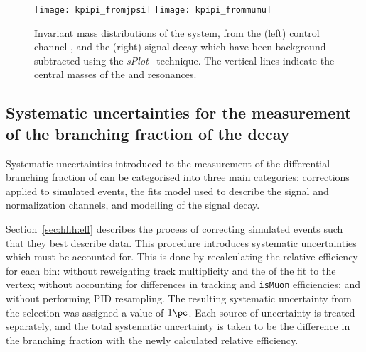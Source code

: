 %
%

\begin{figure}
  \begin{center}
    \texttt{[image: kpipi\_fromjpsi]}
    \texttt{[image: kpipi\_frommumu]}
    \caption[Invariant mass distributions of \kpipi]
    {\small
      Invariant mass distributions of the \kpipi system, from the
      (left) control channel \btojpsikpipi, and the
      (right) signal decay \btokpipimumu
      which have been background subtracted
      using the \emph{sPlot}~\cite{splot} technique.
      The vertical lines indicate the central masses of the  and 
      resonances.
    }
    \label{fig:kpipi:kpipi}
  \end{center}
\end{figure}



\subsection[Systematic uncertainties for the measurement of the branching fraction of the decay
  \btokpipimumu]{Systematic uncertainties for the measurement of the branching fraction of the
    decay \tmath{\btokpipimumu}}
\label{ssec:kpipi:syst}

Systematic uncertainties introduced to the measurement of the differential branching fraction of
\btokpipimumu can be categorised into three main categories:
corrections applied to simulated events,
the fits model used to describe the signal and normalization channels, and
modelling of the signal decay.

Section~\ref{sec:hhh:eff} describes the process of correcting simulated events such that they best
describe data.
This procedure introduces systematic uncertainties which must be accounted for.
This is done by recalculating the relative efficiency for each \qsq bin:
without reweighting track multiplicity and the \chisq of the fit to the \Bp vertex;
without accounting for differences in tracking and {\tt isMuon} efficiencies;
and without performing PID resampling.
The resulting systematic uncertainty from the selection was assigned a value of $1\pc$.
Each source of uncertainty is treated separately, and the total systematic uncertainty is taken to
be the difference in the branching fraction with the newly calculated relative efficiency.

